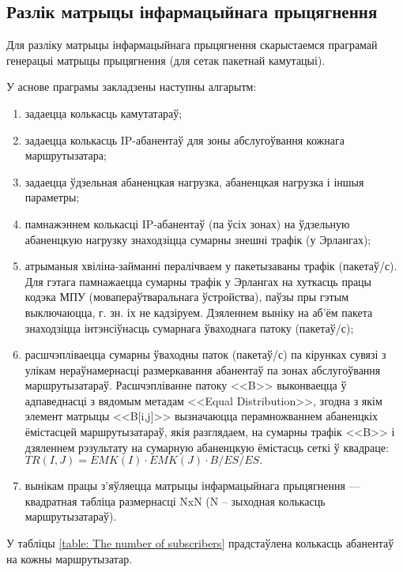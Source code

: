 \subsection{Разлік матрыцы інфармацыйнага прыцягнення}

Для разліку матрыцы інфармацыйнага прыцягнення скарыстаемся
праграмай генерацыі матрыцы прыцягнення (для сетак пакетнай камутацыі).

У аснове праграмы закладзены наступны алгарытм:
\begin{enumerate}
    \item задаецца колькасць камутатараў;
    \item задаецца колькасць IP-абанентаў для зоны абслугоўвання
          кожнага маршрутызатара;
    \item задаецца ўдзельная абаненцкая нагрузка,
          абаненцкая нагрузка і іншыя параметры;
    \item памнажэннем колькасці IP-абанентаў (па ўсіх зонах)
          на ўдзельную абаненцкую нагрузку знаходзіцца
          сумарны знешні трафік (у Эрлангах);
    \item атрыманыя хвіліна-займанні пералічваем у пакетызаваны
          трафік (пакетаў/с).
          Для гэтага памнажаецца сумарны трафік у Эрлангах на
          хуткасць працы кодэка МПУ (мовапераўтваральнага ўстройства),
          паўзы пры гэтым выключаюцца,
          г. зн. іх не кадзіруем. Дзяленнем выніку на
          аб'ём пакета знаходзіцца інтэнсіўнасць
          сумарнага ўваходнага патоку (пакетаў/с);
    \item расшчэпліваецца сумарны ўваходны паток (пакетаў/с) па
          кірунках сувязі з улікам нераўнамернасці размеркавання
          абанентаў па зонах абслугоўвання маршрутызатараў.
          Расшчэпліванне патоку <<B>> выконваецца ў адпаведнасці
          з вядомым метадам <<Equal Distribution>>, згодна з якім
          элемент матрыцы <<B[i,j]>> вызначаюцца перамножваннем
          абаненцкіх ёмістасцей маршрутызатараў, якія разглядаем,
          на сумарны трафік <<B>> і дзяленнем рэзультату на
          сумарную абаненцкую ёмістасць сеткі ў квадраце:
          $TR(I,J) = EMK(I) \cdot EMK(J) \cdot B / ES / ES.$
    \item вынікам працы з'яўляецца матрыцы інфармацыйнага прыцягнення ---
          квадратная таб\-лі\-ца размернасці NxN (N -- зыходная колькасць
          маршрутызатараў).
\end{enumerate}

У табліцы \ref{table: The number of subscribers} прадстаўлена
колькасць абанентаў на кожны маршрутызатар.

